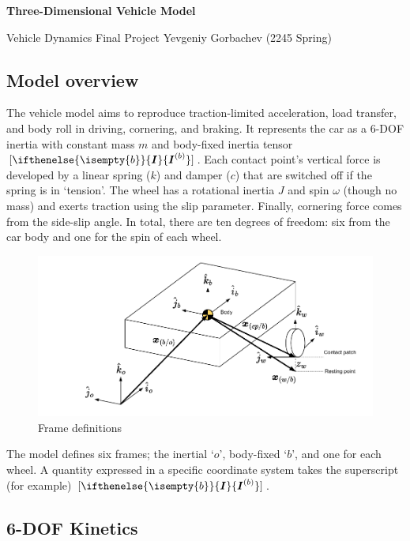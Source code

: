 \documentclass[9pt]{extarticle}
\renewcommand{\vec}[2][]{\ifthenelse{\isempty{#1}}{\boldsymbol{#2}}{\boldsymbol{#2}^{(#1)}} }
\begin{document}
\begin{center}
	\LARGE \bf Three-Dimensional Vehicle Model
\end{center}
Vehicle Dynamics Final Project \hfill Yevgeniy Gorbachev (2245 Spring)

\begin{multicols*}{2}
\section{Model overview}
The vehicle model aims to reproduce traction-limited acceleration, load
	transfer, and body roll in driving, cornering, and braking. It represents
	the car as a 6-DOF inertia with constant mass \(m\) and body-fixed inertia
	tensor \([\vec[b]{I}]\). Each contact point's vertical force is developed by
	a linear spring (\(k\)) and damper (\(c\)) that are switched off if the
	spring is in `tension'. The wheel has a rotational inertia
	\(J\) and spin \(\omega\) (though no mass) and exerts traction using the
	slip parameter. Finally, cornering force comes from the side-slip angle.
	In total, there are ten degrees of freedom: six from the car body and one
	for the spin of each wheel.

\begin{figure}[H]
	\centering
	\includegraphics[width=\linewidth]{fig/frames.pdf}
	\caption{Frame definitions}
\end{figure}

The model defines six frames; the inertial `\(o\)', body-fixed `\(b\)', and one
for each wheel. A quantity expressed in a specific coordinate system takes the
	superscript (for example) \([\vec[b]{I}]\).

\subsection{6-DOF Kinetics}


\end{multicols*}
\end{document}
